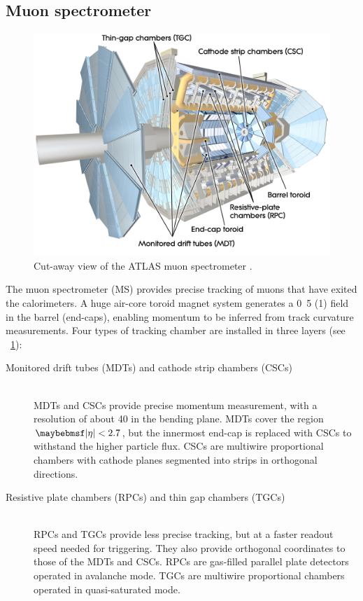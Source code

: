 \subsection{Muon spectrometer}
\label{sec:atlas:ms}

\begin{figure}
	\includegraphics[width=\mediumfigwidth]{tex/experiment/ms_whole}
	\caption{Cut-away view of the ATLAS muon spectrometer \cite{ATLAS-detector}.}
	\label{fig:muon_spectrometer}
\end{figure}

The muon spectrometer (MS) provides precise tracking of muons that have exited the 
calorimeters. A huge air-core toroid magnet system generates a \unit{0.5}{\tesla} 
(\unit{1}{\tesla}) field in the barrel (end-caps), enabling momentum to be inferred from 
track curvature measurements. Four types of tracking chamber are installed in three 
layers (see \Figure~\ref{fig:muon_spectrometer}):
\begin{description}
\item[Monitored drift tubes (MDTs) and cathode strip chambers (CSCs)] \hfill \\
	MDTs and CSCs provide precise momentum measurement, with a resolution of 
	about \unit{40}{\micro\metre} in the bending plane. MDTs cover the region 
	$\mods{\eta} < 2.7$, but the innermost end-cap is replaced with CSCs to 
	withstand the higher particle flux. CSCs are multiwire proportional chambers 
	with cathode planes segmented into strips in orthogonal directions.
\item[Resistive plate chambers (RPCs) and thin gap chambers (TGCs)] \hfill \\
	RPCs and TGCs provide less precise tracking, but at a faster readout speed needed for 
	triggering. They also provide orthogonal coordinates to those of the MDTs and CSCs. 
	RPCs are gas-filled parallel plate detectors operated in avalanche mode.
	TGCs are multiwire proportional chambers operated in quasi-saturated mode.
\end{description}



